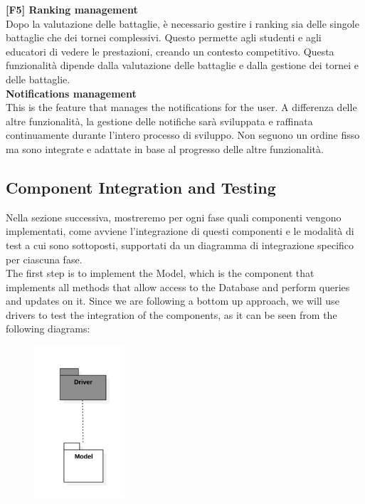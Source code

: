 \noindent \textbf{[F5] Ranking management}\\
Dopo la valutazione delle battaglie, è necessario gestire i ranking sia delle singole battaglie che dei tornei complessivi. Questo permette agli studenti e agli educatori di vedere le prestazioni, creando un contesto competitivo. Questa funzionalità dipende dalla valutazione delle battaglie e dalla gestione dei tornei e delle battaglie.\\
\noindent \textbf{ Notifications management}\\
This is the feature that manages the notifications for the user.
A differenza delle altre funzionalità, la gestione delle notifiche  sarà sviluppata e raffinata continuamente durante l'intero processo di sviluppo. Non seguono un ordine fisso ma sono integrate e adattate in base al progresso delle altre funzionalità.

\subsection{Component Integration and Testing}
Nella sezione successiva, mostreremo per ogni fase quali componenti vengono implementati, come avviene l'integrazione di questi componenti e le modalità di test a cui sono sottoposti, supportati da un diagramma di integrazione specifico per ciascuna fase.\\

The first step is to implement the Model, which is the component that implements all methods that allow access to the Database and perform queries and updates on it. Since we are following a bottom up approach, we will use drivers to test the integration of the components, as it can be seen from the following diagrams:

\begin{figure}[H]
    \centering
    \includegraphics[width=0.3\textwidth]{Test/Model.png}
    \label{fig:enter-label}
\end{figure}

